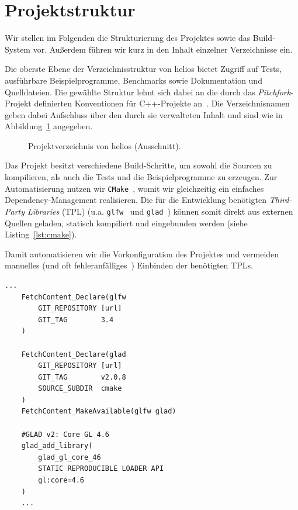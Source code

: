 \section{Projektstruktur}
Wir stellen im Folgenden die Strukturierung des Projektes sowie das Build-System vor.
Außerdem führen wir kurz in den Inhalt einzelner Verzeichnisse ein.\par

Die oberste Ebene der Verzeichnisstruktur von helios bietet Zugriff auf Tests, ausführbare Beispielprogramme, Benchmarks sowie Dokumentation und Quelldateien.
Die gewählte Struktur lehnt sich dabei an die durch das \textit{Pitchfork}-Projekt definierten Konventionen für C++-Projekte an~\cite[]{Pitchfork}.
Die Verzeichnisnamen geben dabei Aufschluss über den durch sie verwalteten Inhalt und sind wie in Abbildung~\ref{fig:verzeichnisstruktur} angegeben.\par

\begin{figure}[htbp]
    \setlength{\DTbaselineskip}{18pt}
    \caption{Projektverzeichnis von helios (Ausschnitt).}
    \label{fig:verzeichnisstruktur}
\end{figure}

Das Projekt besitzt verschiedene Build-Schritte, um sowohl die Sourcen zu kompilieren, als auch die Tests und die Beispielprogramme zu erzeugen.
Zur Automatisierung nutzen wir \texttt{CMake}~\cite[]{CMake}, womit wir gleichzeitig ein einfaches Dependency-Management realisieren.
Die für die Entwicklung benötigten \textit{Third-Party Libraries} (TPL) (u.a. \texttt{glfw}~\cite[]{glfwHomepage} und \texttt{glad}~\cite[]{gladgithub}) können somit direkt aus externen Quellen geladen, statisch kompiliert und eingebunden werden (siehe Listing~\ref{lst:cmake}).\par

Damit automatisieren wir die Vorkonfiguration des Projektes und vermeiden manuelles (und oft fehleranfälliges~\cite[]{FG22}) Einbinden der benötigten TPLs.

\vspace{4mm}
\begin{lstlisting}[style=c++style, caption={Ausschnitt aus der CMakeLists.txt von helios: Dieser Abschnitt deklariert und bezieht GLFW v3.4 und GLAD v2.0.8 per FetchContent von den jeweiligen Github-Repositories (URLs der Übersicht halber ausgelassen). Im Anschluss wird ein GLAD-Loader für OpenGL 4.6 als statische Bibliothek erzeugt.}, label=lst:cmake]
    ...
    FetchContent_Declare(glfw
        GIT_REPOSITORY [url]
        GIT_TAG        3.4
    )

    FetchContent_Declare(glad
        GIT_REPOSITORY [url]
        GIT_TAG        v2.0.8
        SOURCE_SUBDIR  cmake
    )
    FetchContent_MakeAvailable(glfw glad)

    #GLAD v2: Core GL 4.6
    glad_add_library(
        glad_gl_core_46
        STATIC REPRODUCIBLE LOADER API
        gl:core=4.6
    )
    ...
\end{lstlisting}
\vspace{4mm}

